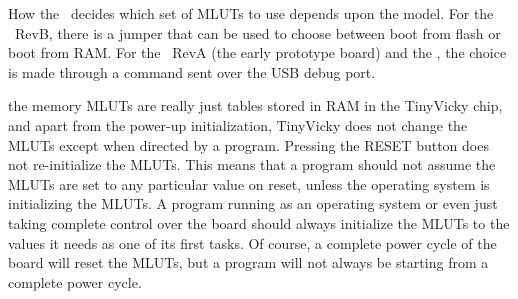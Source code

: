 How the \jr\ decides which set of MLUTs to use depends upon the model. For the \fjr\ RevB, there is a jumper that can be used to choose between boot from flash or boot from RAM. For the \fjr\ RevA (the early prototype board) and the \fk, the choice is made through a command sent over the USB debug port.

\begin{note}
	the memory MLUTs are really just tables stored in RAM in the TinyVicky chip, and apart from the power-up initialization, TinyVicky does not change the MLUTs except when directed by a program. Pressing the RESET button does not re-initialize the MLUTs. This means that a program should not assume the MLUTs are set to any particular value on reset, unless the operating system is initializing the MLUTs. A program running as an operating system or even just taking complete control over the board should always initialize the MLUTs to the values it needs as one of its first tasks. Of course, a complete power cycle of the board will reset the MLUTs, but a program will not always be starting from a complete power cycle.
\end{note}
